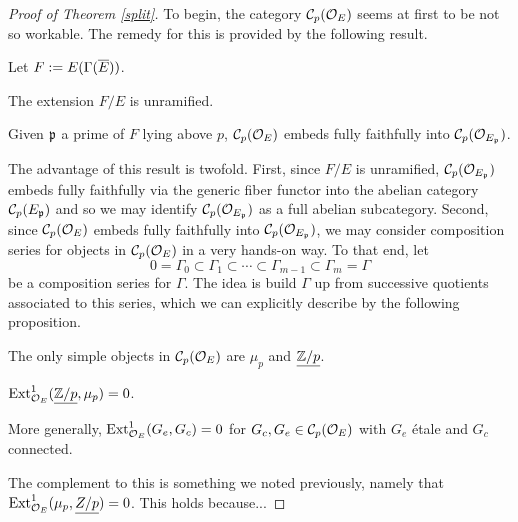 \documentclass[11pt]{article}
\begin{document}
\begin{proof}[Proof of Theorem \ref{split}]
To begin, the category $\mathcal{C}_p(\mathcal{O}_E)$ seems at first to be not so workable. The remedy for this is provided by the following result.

\begin{proposition}\label{geometric_points}
Let $F:=E(\Gamma(\overline{E}))$. 
\begin{enum}{\alph}
\item The extension $F/E$ is unramified.

\item Given $\mathfrak{p}$ a prime of $F$ lying above $p$, $\mathcal{C}_p(\mathcal{O}_E)$ embeds fully faithfully into $\mathcal{C}_p(\mathcal{O}_{E_{\mathfrak{p}}})$.
\end{enum}
\end{proposition}

The advantage of this result is twofold. First, since $F/E$ is unramified, $\mathcal{C}_p(\mathcal{O}_{E_{\mathfrak{p}}})$ embeds fully faithfully via the generic fiber functor into the abelian category $\mathcal{C}_p(E_{\mathfrak{p}})$ and so we may identify $\mathcal{C}_p(\mathcal{O}_{E_{\mathfrak{p}}})$ as a full abelian subcategory. Second, since $\mathcal{C}_p(\mathcal{O}_E)$ embeds fully faithfully into $\mathcal{C}_p(\mathcal{O}_{E_{\mathfrak{p}}})$, we may consider composition series for objects in $\mathcal{C}_p(\mathcal{O}_E)$ in a very hands-on way. To that end, let
$$0=\Gamma_0\subset\Gamma_1\subset\cdots\subset\Gamma_{m-1}\subset\Gamma_m=\Gamma$$
be a composition series for $\Gamma$. The idea is build $\Gamma$ up from successive quotients associated to this series, which we can explicitly describe by the following proposition.

\begin{proposition}\label{building_blocks}
\hfill
\begin{enum}{\alph}
\item The only simple objects in $\mathcal{C}_p(\mathcal{O}_E)$ are $\mu_p$ and $\underline{\mathbb{Z}/p}$.

\item $\operatorname{Ext}_{\mathcal{O}_E}^1(\underline{\mathbb{Z}/p},\mu_p)=0$.

\item More generally, $\operatorname{Ext}_{\mathcal{O}_E}^1(G_e,G_c)=0$ for $G_c,G_e\in\mathcal{C}_p(\mathcal{O}_E)$ with $G_e$ \'{e}tale and $G_c$ connected.
\end{enum}
\end{proposition}

The complement to this is something we noted previously, namely that $\operatorname{Ext}_{\mathcal{O}_E}^1(\mu_p,\underline{Z/p})=0$. This holds because... 


\end{proof}
\end{document}
